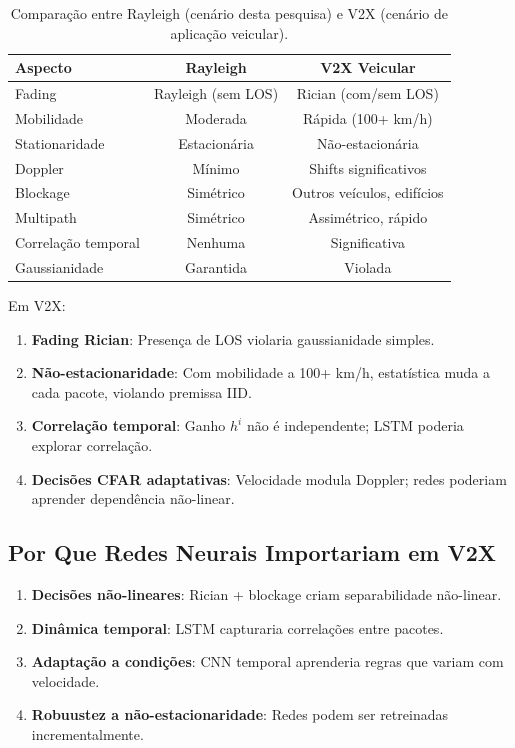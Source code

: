 \documentclass{sbrt}
\begin{document}
\begin{table}[H]
\centering
\begin{tabular}{lcc}
\toprule
\textbf{Aspecto} & \textbf{Rayleigh} & \textbf{V2X Veicular} \\
\midrule
Fading & Rayleigh (sem LOS) & Rician (com/sem LOS) \\
Mobilidade & Moderada & Rápida (100+ km/h) \\
Stationaridade & Estacionária & Não-estacionária \\
Doppler & Mínimo & Shifts significativos \\
Blockage & Simétrico & Outros veículos, edifícios \\
Multipath & Simétrico & Assimétrico, rápido \\
Correlação temporal & Nenhuma & Significativa \\
Gaussianidade & Garantida & Violada \\
\bottomrule
\end{tabular}
\caption{Comparação entre Rayleigh (cenário desta pesquisa) e V2X (cenário de aplicação veicular).}
\label{tab:rayleigh_vs_v2x}
\end{table}

Em V2X:
\begin{enumerate}
\item \textbf{Fading Rician}: Presença de LOS violaria gaussianidade simples.
\item \textbf{Não-estacionaridade}: Com mobilidade a 100+ km/h, estatística muda a cada pacote, violando premissa IID.
\item \textbf{Correlação temporal}: Ganho $h^i$ não é independente; LSTM poderia explorar correlação.
\item \textbf{Decisões CFAR adaptativas}: Velocidade modula Doppler; redes poderiam aprender dependência não-linear.
\end{enumerate}

\subsection{Por Que Redes Neurais Importariam em V2X}

\begin{enumerate}
\item \textbf{Decisões não-lineares}: Rician + blockage criam separabilidade não-linear.
\item \textbf{Dinâmica temporal}: LSTM capturaria correlações entre pacotes.
\item \textbf{Adaptação a condições}: CNN temporal aprenderia regras que variam com velocidade.
\item \textbf{Robuustez a não-estacionaridade}: Redes podem ser retreinadas incrementalmente.
\end{enumerate}
\end{document}
